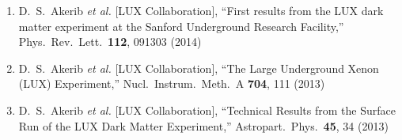 \documentclass[a4paper,10pt]{article}
\begin{document}
\begin{enumerate}
\item   D.~S.~Akerib {\it et al.} [LUX Collaboration],
  ``First results from the LUX dark matter experiment at the Sanford Underground Research Facility,''
  Phys.\ Rev.\ Lett.\  {\bf 112}, 091303 (2014)

\item   D.~S.~Akerib {\it et al.} [LUX Collaboration],
  ``The Large Underground Xenon (LUX) Experiment,''
  Nucl.\ Instrum.\ Meth.\ A {\bf 704}, 111 (2013)
 
\item   D.~S.~Akerib {\it et al.} [LUX Collaboration],
  ``Technical Results from the Surface Run of the LUX Dark Matter Experiment,''
  Astropart.\ Phys.\  {\bf 45}, 34 (2013)
 
\end{enumerate}
\end{document}
